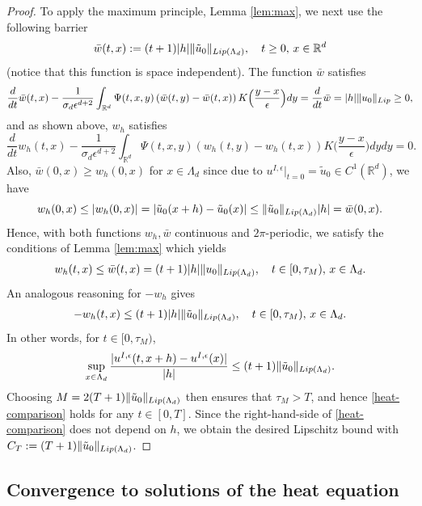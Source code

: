 \documentclass[a4paper,11pt]{amsart}
\newcommand{\red}[1]{{#1}}
\newcommand{\R}{\mathbb{R}}
\newcommand{\ep}{\epsilon}
\numberwithin{equation}{section}
\numberwithin{theorem}{section}
\theoremstyle{definition}
\begin{document}
\begin{proof}
To apply the maximum principle, Lemma \ref{lem:max}, we next use the following barrier
\[
\bar w(t,x):=(t+1)|h|\|\tilde u_0\|_{\rm Lip(\Lambda_d)}, \quad t\ge0, \, x\in\R^d
\]
(notice that this function is space independent). The function $\bar w$ satisfies
\[
\frac{d}{dt}\bar w (t,x)- \frac{1}{\sigma_d\ep^{d+2}}\int_{\R^d}\Psi(t, x, y)\left(\bar w(t, y)-\bar w(t, x)\right) K\Big(\frac{y-x}{\ep}\Big)dy =\frac{d}{dt}\bar w= |h|\|u_0\|_{\rm Lip}\ge 0,
\]
and as shown above, $w_h$ satisfies
\[
\frac{d}{dt}w_h(t,x)-\frac{1}{\sigma_d\ep^{d+2}}\int_{\R^d}\Psi\left(t, x, y\right)\left(w_h(t, y)-w_h(t, x)\right) K\Big(\frac{y-x}{\ep}\Big)dy dy=0.
\]
Also, $\bar w(0,x)\geq  w_h(0,x)$ for $x\in\Lambda_d$ since due to $u^{I,\ep}|_{t=0}=\tilde u_0\in C^1(\R^d)$, we have
\[
w_h(0,x)\le |w_h(0,x)|=|\tilde u_0(x+h)-\tilde u_0(x)|\le \|\tilde u_0\|_{\rm Lip(\Lambda_d)}|h|=\bar w(0,x).
\]
Hence, \red{with both functions $w_h, \bar w$ continuous and $2\pi$-periodic,} we satisfy the conditions of Lemma \ref{lem:max} which yields
\begin{align*}
w_h(t,x)\leq \bar w(t,x)= (t+1) |h|\|u_0\|_{\rm Lip(\Lambda_d)},\quad t\in[0,\tau_M),\, x\in\Lambda_d.
\end{align*}
An analogous reasoning for $-w_h$ gives 
\begin{align*}
-w_h(t,x)\leq (t+1) |h|\|\tilde u_0\|_{\rm Lip(\Lambda_d)},\quad t\in[0,\tau_M),\, x\in\Lambda_d.
\end{align*}
In other words, for $t\in[0,\tau_M)$,
\begin{align}\label{heat-comparison}
\sup_{x\in\Lambda_d}\frac{|u^{I,\ep}(t,x+h)-u^{I,\ep}(x)|}{|h|}\le (t+1)\|\tilde u_0\|_{\rm Lip(\Lambda_d)}.
\end{align}
Choosing $M=2(T+1)\|\tilde u_0\|_{\rm Lip(\Lambda_d)}$ then ensures that $\tau_M> T$, and hence \eqref{heat-comparison} holds for any $t\in[0,T]$. Since the right-hand-side of \eqref{heat-comparison} does not depend on $h$, we obtain the desired Lipschitz bound with $C_T:=(T+1)\|\tilde u_0\|_{\rm Lip(\Lambda_d)}$.
\end{proof}


\subsection{Convergence to solutions of the heat equation}
\end{document}
